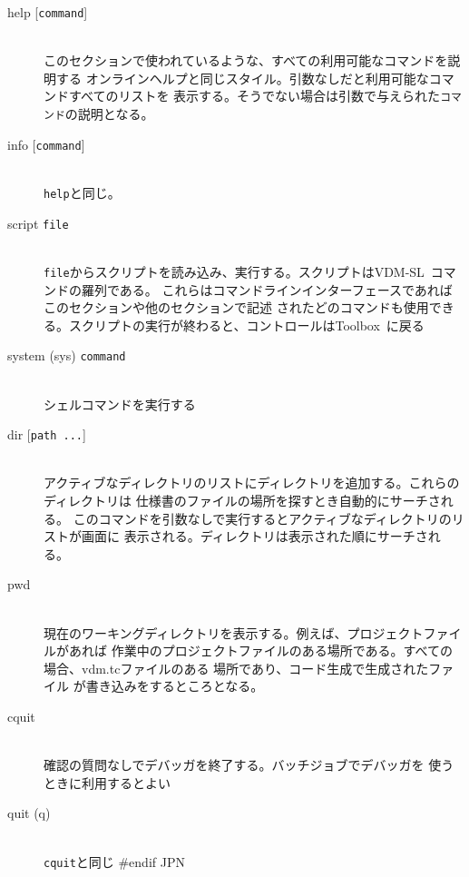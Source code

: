 \documentclass[\pformat,12pt]{article}
\newcommand{\vdmslpp}{VDM-SL}
\newcommand{\Toolbox}{Toolbox}
\newcommand{\vdmslpp}{VDM++}
\newcommand{\Toolbox}{Toolbox}
\begin{document}
\begin{description}
\item[help \mbox{[{\tt command}]}] \mbox{}\\
  このセクションで使われているような、すべての利用可能なコマンドを説明する
  オンラインヘルプと同じスタイル。引数なしだと利用可能なコマンドすべてのリストを
  表示する。そうでない場合は引数で与えられた{\tt コマンド}の説明となる。

\item[info \mbox{[{\tt command}]}] \mbox{}\\
  {\tt help}と同じ。

\item[script {\tt file}] \mbox{}\\
  {\tt file}からスクリプトを読み込み、実行する。スクリプトは\vdmslpp\ コマンドの羅列である。
  これらはコマンドラインインターフェースであればこのセクションや他のセクションで記述
  されたどのコマンドも使用できる。スクリプトの実行が終わると、コントロールは\Toolbox\ に戻る

\item[system (sys) {\tt command}]\mbox{}\\
  シェルコマンドを実行する

\item[dir \mbox{[{\tt path ...}]}] \mbox{}\\
  アクティブなディレクトリのリストにディレクトリを追加する。これらのディレクトリは
  仕様書のファイルの場所を探すとき自動的にサーチされる。
  このコマンドを引数なしで実行するとアクティブなディレクトリのリストが画面に
  表示される。ディレクトリは表示された順にサーチされる。

\item[pwd]  \mbox{}\\
  現在のワーキングディレクトリを表示する。例えば、プロジェクトファイルがあれば
  作業中のプロジェクトファイルのある場所である。すべての場合、vdm.tcファイルのある
  場所であり、コード生成で生成されたファイル 
  が書き込みをするところとなる。

\item[cquit]  \mbox{}\\
  確認の質問なしでデバッガを終了する。バッチジョブでデバッガを
  使うときに利用するとよい

\item[quit (q)] \mbox{}\\
  {\tt cquit}と同じ
#endif JPN

\end{description}
\end{document}
